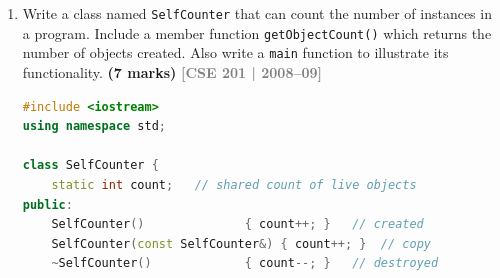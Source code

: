 \documentclass[12pt,a3paper]{article}
\newcommand{\yr}[1]{\hfill\textcolor{gray}{\small\textbf{[#1]}}}
\newcommand{\mk}[1]{\textcolor{orange!70!black}{\small\textbf{(#1 marks)}}}
\begin{document}
\begin{enumerate}
\begin{tcolorbox}[enhanced,breakable,ansbox,colback=cB!4,colframe=cB,
  boxrule=0.8pt,arc=5pt,
  title={\textbf{Answer}},fonttitle=\bfseries\color{white},colbacktitle=cB]
The \texttt{this} pointer is an implicit parameter automatically
passed to every \emph{non-static} member function.  It points to the
specific object on which the function is being called.

A \textbf{static} member function, however, is associated with the
\emph{class} itself, not with any particular object.  It can be
called without creating an object:
\begin{lstlisting}[language=C++]
MyClass::staticMethod();   // no object involved
\end{lstlisting}

Because there is no object in the picture, there is nothing for
\texttt{this} to point to.  The compiler therefore does not pass
a \texttt{this} pointer to static functions, and any attempt to use
\texttt{this} inside a static method is a \textbf{compile error}:

\begin{lstlisting}[language=C++]
class MyClass {
    int x;
    static int s;
public:
    static void f() {
        s = 10;       // OK  -- accesses static member
        // x = 5;    // ERROR: 'this' is unavailable in static function
        // this->x=5; // ERROR: 'this' is unavailable
    }
};
\end{lstlisting}

\end{tcolorbox}

\item Write a class named \texttt{SelfCounter} that can count the number of instances in a program. Include a member function \texttt{getObjectCount()} which returns the number of objects created. Also write a \texttt{main} function to illustrate its functionality. \mk{7}
\yr{CSE 201 | 2008--09}

\begin{tcolorbox}[enhanced,breakable,ansbox,colback=cB!4,colframe=cB,
  boxrule=0.8pt,arc=5pt,
  title={\textbf{Answer}},fonttitle=\bfseries\color{white},colbacktitle=cB]

\begin{lstlisting}[language=C++]
#include <iostream>
using namespace std;

class SelfCounter {
    static int count;   // shared count of live objects
public:
    SelfCounter()              { count++; }   // created
    SelfCounter(const SelfCounter&) { count++; }  // copy
    ~SelfCounter()             { count--; }   // destroyed


\end{lstlisting}
\end{tcolorbox}
\end{enumerate}
\end{document}
